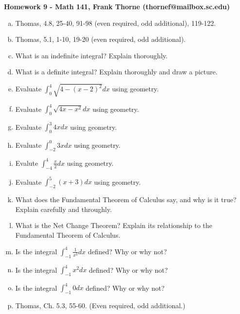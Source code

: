 \documentclass[12pt]{article}
\newcommand{\dx}{dx}
\begin{document}
\setlength{\topmargin}{-2mm}





\begin{center}{\bf Homework 9 - Math 141, Frank Thorne (thornef@mailbox.sc.edu)}
\end{center}

\begin{enumerate}[(a)]

\item
Thomas, 4.8, 25-40, 91-98 (even required, odd additional), 119-122.

\item
Thomas, 5.1, 1-10, 19-20 (even required, odd additional).

\item
What is an indefinite integral? Explain thoroughly.

\item
What is a definite integral? Explain thoroughly and draw a picture.

\item
Evaluate $\int_0^4 \sqrt{4 - (x - 2)^2} \dx$ using geometry.

\item
Evaluate $\int_0^4 \sqrt{4x - x^2} \dx$ using geometry.

\item
Evaluate $\int_0^3 4x \dx$ using geometry.

\item
Evaluate $\int_{-2}^0 3x \dx$ using geometry.

\item
Evalute $\int_{-4}^4 \frac{x}{2} \dx$ using geometry.

\item
Evaluate $\int_{-2}^5 (x + 3) \dx$ using geometry.

\item
What does the Fundamental Theorem of Calculus say, and why is it true? Explain carefully
and throughly.

\item
What is the Net Change Theorem? Explain its relationship to the Fundamental Theorem of Calculus.

\item
Is the integral $\int_{-1}^4 \frac{1}{x^2} dx$ defined? Why or why not?

\item
Is the integral $\int_{-1}^4 x^2 dx$ defined? Why or why not?

\item
Is the integral $\int_{-1}^4 0 dx$ defined? Why or why not?

\item
Thomas, Ch. 5.3, 55-60. (Even required, odd additional.)


\end{enumerate}
\end{document}
